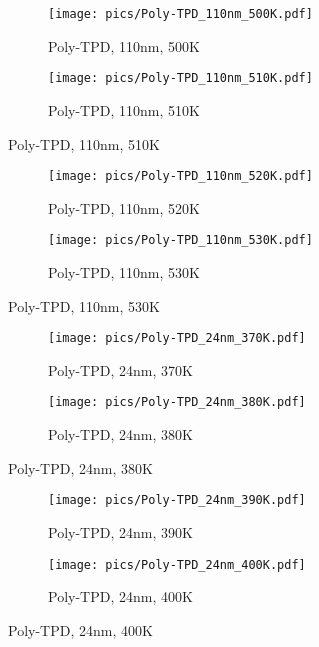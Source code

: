 \begin{figure}[!htb]
\centering
\begin{subfigure}[t]{.5\textwidth}
  \centering
  \texttt{[image: pics/Poly-TPD\_110nm\_500K.pdf]}
  \caption{Poly-TPD, 110nm, 500K}
  \label{fig:sub57}
\end{subfigure}%
\begin{subfigure}[t]{.5\textwidth}
  \centering
  \texttt{[image: pics/Poly-TPD\_110nm\_510K.pdf]}
  \caption{Poly-TPD, 110nm, 510K}
  \label{fig:sub58}
\end{subfigure}%
\end{figure}

\begin{figure}[!htb]
\centering
\begin{subfigure}[t]{.5\textwidth}
  \centering
  \texttt{[image: pics/Poly-TPD\_110nm\_520K.pdf]}
  \caption{Poly-TPD, 110nm, 520K}
  \label{fig:sub59}
\end{subfigure}%
\begin{subfigure}[t]{.5\textwidth}
  \centering
  \texttt{[image: pics/Poly-TPD\_110nm\_530K.pdf]}
  \caption{Poly-TPD, 110nm, 530K}
  \label{fig:sub60}
\end{subfigure}%
\end{figure}

\begin{figure}[!htb]
\centering
\begin{subfigure}[t]{.5\textwidth}
  \centering
  \texttt{[image: pics/Poly-TPD\_24nm\_370K.pdf]}
  \caption{Poly-TPD, 24nm, 370K}
  \label{fig:sub61}
\end{subfigure}%
\begin{subfigure}[t]{.5\textwidth}
  \centering
  \texttt{[image: pics/Poly-TPD\_24nm\_380K.pdf]}
  \caption{Poly-TPD, 24nm, 380K}
  \label{fig:sub62}
\end{subfigure}%
\end{figure}

\begin{figure}[!htb]
\centering
\begin{subfigure}[t]{.5\textwidth}
  \centering
  \texttt{[image: pics/Poly-TPD\_24nm\_390K.pdf]}
  \caption{Poly-TPD, 24nm, 390K}
  \label{fig:sub63}
\end{subfigure}%
\begin{subfigure}[t]{.5\textwidth}
  \centering
  \texttt{[image: pics/Poly-TPD\_24nm\_400K.pdf]}
  \caption{Poly-TPD, 24nm, 400K}
  \label{fig:sub64}
\end{subfigure}%
\end{figure}


